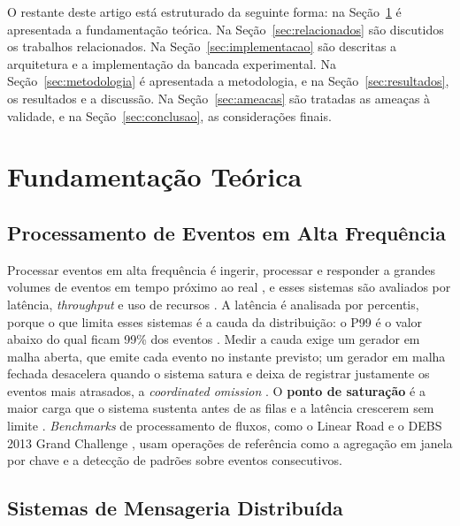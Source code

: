 \documentclass[12pt]{article}
\begin{document}
O restante deste artigo está estruturado da seguinte forma: na Seção~\ref{sec:fundamentacao}
é apresentada a fundamentação teórica. Na Seção~\ref{sec:relacionados} são discutidos os
trabalhos relacionados. Na Seção~\ref{sec:implementacao} são descritas a arquitetura e a
implementação da bancada experimental. Na Seção~\ref{sec:metodologia} é apresentada a
metodologia, e na Seção~\ref{sec:resultados}, os resultados e a discussão. Na
Seção~\ref{sec:ameacas} são tratadas as ameaças à validade, e na
Seção~\ref{sec:conclusao}, as considerações finais.


\section{Fundamentação Teórica}
\label{sec:fundamentacao}

\subsection{Processamento de Eventos em Alta Frequência}

Processar eventos em alta frequência é ingerir, processar e responder a grandes volumes de
eventos em tempo próximo ao real \cite{luckham:2011,cugola:2012}, e esses sistemas são
avaliados por latência, \textit{throughput} e uso de recursos \cite{jain:1991,fu:2021}. A latência
é analisada por percentis, porque o que limita esses sistemas é a cauda da distribuição: o
P99 é o valor abaixo do qual ficam 99\% dos eventos \cite{fu:2021}. Medir a cauda exige um
gerador em malha aberta, que emite cada evento no instante previsto; um gerador em malha
fechada desacelera quando o sistema satura e deixa de registrar justamente os eventos mais
atrasados, a \textit{coordinated omission} \cite{tene:2015}. O \textbf{ponto de
saturação} é a maior carga que o sistema sustenta antes de as filas e a latência crescerem
sem limite \cite{jain:1991}. \textit{Benchmarks} de processamento de fluxos, como o Linear Road
\cite{arasu:2004} e o DEBS 2013 Grand Challenge \cite{mutschler:2013}, usam operações de
referência como a agregação em janela por chave e a detecção de padrões sobre eventos
consecutivos.

\subsection{Sistemas de Mensageria Distribuída}
\end{document}
